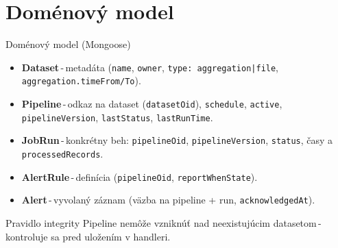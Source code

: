 \documentclass[aspectratio=169,11pt]{beamer}
\begin{document}
\section{Doménový model}
\begin{frame}{Doménový model (Mongoose)}
  \small
  \begin{itemize}
    \item \textbf{Dataset}\,-\,metadáta (\texttt{name}, \texttt{owner}, \texttt{type: aggregation|file}, \texttt{aggregation.timeFrom/To}).
    \item \textbf{Pipeline}\,-\,odkaz na dataset (\texttt{datasetOid}), \texttt{schedule}, \texttt{active}, \texttt{pipelineVersion}, \texttt{lastStatus}, \texttt{lastRunTime}.
    \item \textbf{JobRun}\,-\,konkrétny beh: \texttt{pipelineOid}, \texttt{pipelineVersion}, \texttt{status}, časy a \texttt{processedRecords}.
    \item \textbf{AlertRule}\,-\,definícia (\texttt{pipelineOid}, \texttt{reportWhenState}).
    \item \textbf{Alert}\,-\,vyvolaný záznam (väzba na pipeline + run, \texttt{acknowledgedAt}).
  \end{itemize}
  \begin{block}{Pravidlo integrity}
    Pipeline nemôže vzniknúť nad neexistujúcim datasetom\,-\,kontroluje sa pred uložením v handleri.
  \end{block}
\end{frame}

\end{document}

